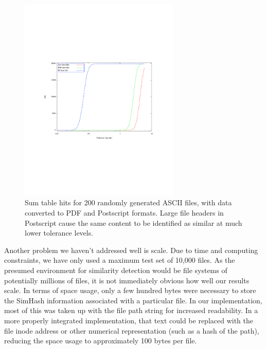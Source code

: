 \documentclass[10pt, twocolumn]{article}
\begin{document}
 \begin{figure}[t] 
 \centering
\includegraphics[width= 3in]{fileFormats.pdf}
\caption{Sum table hits for 200 randomly generated ASCII files, with data converted to PDF and Postscript formats.  Large file headers in Postscript cause the same content to be identified as similar at much lower tolerance levels.}
\label{headerFiles}
\end{figure}

Another problem we haven't addressed well is scale.  Due to time and computing constraints, we have only used a maximum test set of 10,000 files.  As the presumed environment for similarity detection would be file systems of potentially millions of files, it is not immediately obvious how well our results scale.  In terms of space usage, only a few hundred bytes were necessary to store the SimHash information associated with a particular file. In our implementation, most of this was taken up with the file path string for increased readability.  In a more properly integrated implementation, that text could be replaced with the file inode address or other numerical representation (such as a hash of the path), reducing the space usage to approximately 100 bytes per file.
\end{document}
